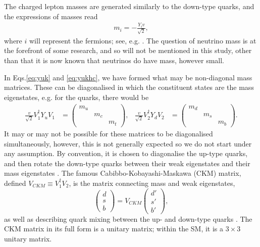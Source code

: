 \documentclass[a4paper,12pt]{article}
\begin{document}
The charged lepton masses are generated similarly to the down-type quarks, and the expressions of masses read
\begin{align}
    \label{eq:fermas}
    m_i = -\frac{Y_iv}{\sqrt{2}},
\end{align}
where $i$ will represent the fermions; see, e.g. \cite{schwartz}. 
The question of neutrino mass is at the forefront of some research, and so will not be mentioned in this study, other than that it is now known that neutrinos do have mass, however small. 

In Eqs.\eqref{eq:yuk} and \eqref{eq:yukhc}, we have formed what may be non-diagonal mass matrices. 
These can be diagonalised in which the constituent states are the mass eigenstates, e.g. for the quarks, there would be 
\begin{align}
    \label{eq:massmat}
    \frac{v}{\sqrt{2}}V_1^\dagger Y_uV_1 &= \begin{pmatrix} m_u & & \\ & m_c & \\ & & m_t\end{pmatrix}, & \frac{v}{\sqrt{2}}V_2^\dagger Y_dV_2 &= \begin{pmatrix} m_d & & \\ & m_s & \\ & & m_b\end{pmatrix}.
\end{align}
It may or may not be possible for these matrices to be diagonalised simultaneously, however, this is not generally expected so we do not start under any assumption. 
By convention, it is chosen to diagonalise the up-type quarks, and then rotate the down-type quarks between their weak eigenstates and their mass eigenstates \cite{peskin}. 
The famous Cabibbo-Kobayashi-Maskawa (CKM) matrix, defined $V_{CKM}\equiv V_1^\dagger V_2$, is the matrix connecting mass and weak eigenstates,
\begin{equation}
    \label{eq:ckmone}
    \begin{pmatrix} d \\ s \\ b\end{pmatrix} = V_{CKM}\begin{pmatrix} d' \\ s' \\ b'\end{pmatrix},
\end{equation}
as well as describing quark mixing between the up- and down-type quarks \cite{kobamask}. 
The CKM matrix in its full form is a unitary matrix; within the SM, it is a $3\times3$ unitary matrix. 
\end{document}
